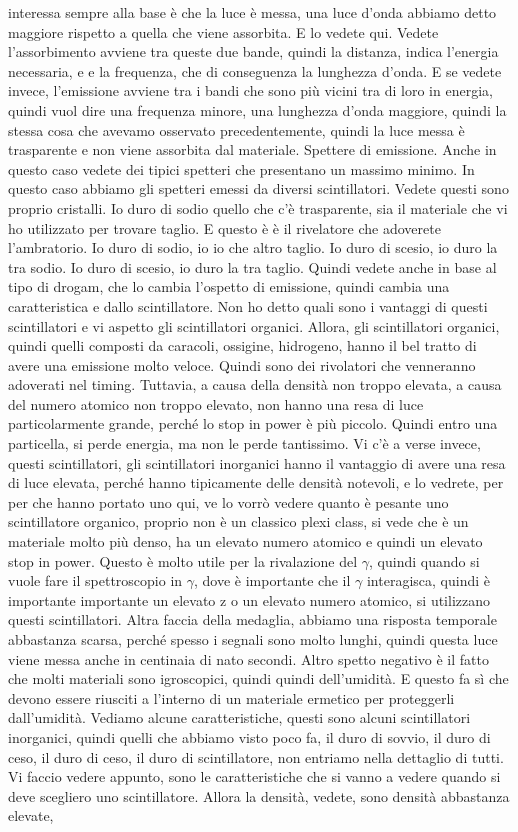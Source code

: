 interessa sempre alla base è che la luce è messa, una luce d'onda abbiamo detto maggiore rispetto a quella che viene assorbita. E lo vedete qui. Vedete l'assorbimento avviene tra queste due bande, quindi la distanza, indica l'energia necessaria, e e la frequenza, che di conseguenza la lunghezza d'onda. E se vedete invece, l'emissione avviene tra i bandi che sono più vicini tra di loro in energia, quindi vuol dire una frequenza minore, una lunghezza d'onda maggiore, quindi la stessa cosa che avevamo osservato precedentemente, quindi la luce messa è trasparente e non viene assorbita dal materiale. Spettere di emissione. Anche in questo caso vedete dei tipici spetteri che presentano un massimo minimo. In questo caso abbiamo gli spetteri emessi da diversi scintillatori. Vedete questi sono proprio cristalli. Io duro di sodio quello che c'è trasparente, sia il materiale che vi ho utilizzato per trovare taglio. E questo è è il rivelatore che adoverete l'ambratorio. Io duro di sodio, io io che altro taglio. Io duro di scesio, io duro la tra sodio. Io duro di scesio, io duro la tra taglio. Quindi vedete anche in base al tipo di drogam, che lo cambia l'ospetto di emissione, quindi cambia una caratteristica e dallo scintillatore. Non ho detto quali sono i vantaggi di questi scintillatori e vi aspetto gli scintillatori organici. Allora, gli scintillatori organici, quindi quelli composti da caracoli, ossigine, hidrogeno, hanno il bel tratto di avere una emissione molto veloce. Quindi sono dei rivolatori che venneranno adoverati nel timing. Tuttavia, a causa della densità non troppo elevata, a causa del numero atomico non troppo elevato, non hanno una resa di luce particolarmente grande, perché lo stop in power è più piccolo. Quindi entro una particella, si perde energia, ma non le perde tantissimo. Vi c'è a verse invece, questi scintillatori, gli scintillatori inorganici hanno il vantaggio di avere una resa di luce elevata, perché hanno tipicamente delle densità notevoli, e lo vedrete, per per che hanno portato uno qui, ve lo vorrò vedere quanto è pesante uno scintillatore organico, proprio non è un classico plexi class, si vede che è un materiale molto più denso, ha un elevato numero atomico e quindi un elevato stop in power. Questo è molto utile per la rivalazione del $\gamma$, quindi quando si vuole fare il spettroscopio in $\gamma$, dove è importante che il $\gamma$ interagisca, quindi è importante importante un elevato z o un elevato numero atomico, si utilizzano questi scintillatori. Altra faccia della medaglia, abbiamo una risposta temporale abbastanza scarsa, perché spesso i segnali sono molto lunghi, quindi questa luce viene messa anche in centinaia di nato secondi. Altro spetto negativo è il fatto che molti materiali sono igroscopici, quindi quindi dell'umidità. E questo fa sì che devono essere riusciti a l'interno di un materiale ermetico per proteggerli dall'umidità. Vediamo alcune caratteristiche, questi sono alcuni scintillatori inorganici, quindi quelli che abbiamo visto poco fa, il duro di sovvio, il duro di ceso, il duro di ceso, il duro di scintillatore, non entriamo nella dettaglio di tutti. Vi faccio vedere appunto, sono le caratteristiche che si vanno a vedere quando si deve scegliero uno scintillatore. Allora la densità, vedete, sono densità abbastanza elevate, 